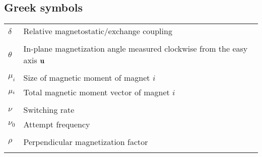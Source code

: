 \subsection*{Greek symbols}
\begin{longtable}[l]{p{60pt} p{350pt}}



	$\delta$ & Relative magnetostatic/exchange coupling \\
	&\\


	$\theta$ & In-plane magnetization angle measured clockwise from the easy axis $\vb{u}$ \\
	&\\




	$\mu_i$ & Size of magnetic moment of magnet $i$ \\
	$\vb{\mu}_i$ & Total magnetic moment vector of magnet $i$ \\
	&\\

	
	$\nu$ & Switching rate \\
	$\nu_0$ & Attempt frequency \\
	&\\

	$\rho$ & Perpendicular magnetization factor \\
	&\\


\end{longtable}
